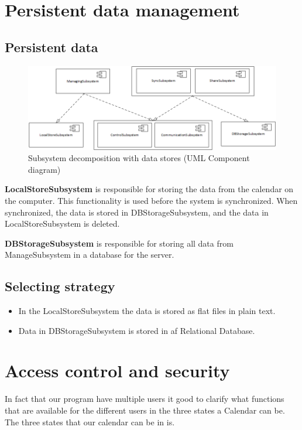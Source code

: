 \clearpage
\section*{Persistent data management}
\subsection{Persistent data}
\begin{figure}[ht!]
\centering
\includegraphics[width=160mm]{UMLComponentData.png}
\caption{Subsystem decomposition with data stores (UML Component diagram) \label{overflow}}
\end{figure}

\textbf{LocalStoreSubsystem} is responsible for storing the data from the calendar on the computer. This functionality is used before the system is synchronized. When synchronized, the data is stored in DBStorageSubsystem, and the data in LocalStoreSubsystem is deleted. 

\textbf{DBStorageSubsystem} is responsible for storing all data from ManageSubsystem in a database for the server. 


\subsection*{Selecting strategy}
\begin{itemize}
	\item In the LocalStoreSubsystem the data is stored as flat files in plain text. 
	\item Data in DBStorageSubsystem is stored in af Relational Database. 
\end{itemize}

\clearpage
\section*{Access control and security}

In fact that our program have multiple users it good to clarify what functions that are available for the different users in the three states a Calendar can be. The three states that our calendar can be in is.

